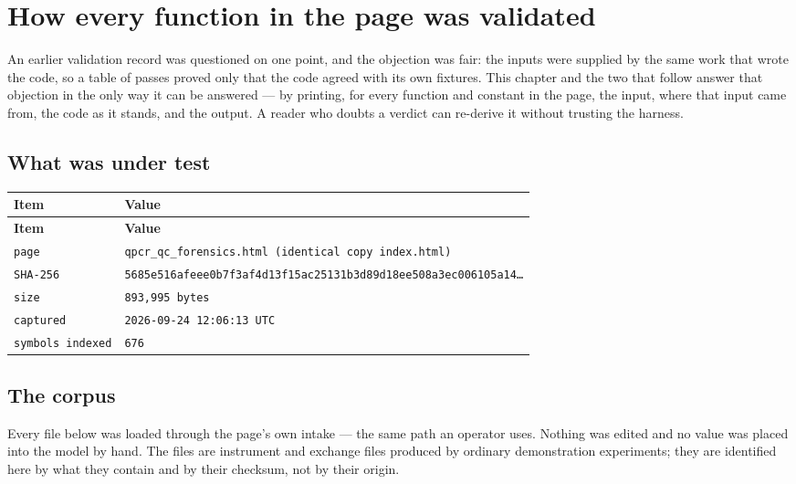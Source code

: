 \chapter{How every function in the page was validated}\label{ch:val-method}

An earlier validation record was questioned on one point, and the objection was
fair: the inputs were supplied by the same work that wrote the code, so a table of
passes proved only that the code agreed with its own fixtures. This chapter and
the two that follow answer that objection in the only way it can be answered ---
by printing, for every function and constant in the page, the input, where that
input came from, the code as it stands, and the output. A reader who doubts a
verdict can re-derive it without trusting the harness.

\section{What was under test}

{\small
\begin{xltabular}{\linewidth}{|X|l|}
\toprule \textbf{Item} & \textbf{Value} \\\midrule\endfirsthead
\toprule \textbf{Item} & \textbf{Value} \\\midrule\endhead
\texttt{page} & \texttt{qpcr\_qc\_forensics.html (identical copy index.html)} \\
\texttt{SHA-256} & \texttt{5685e516afeee0b7f3af4d13f15ac25131b3d89d18ee508a3ec006105a14…} \\
\texttt{size} & \texttt{893,995 bytes} \\
\texttt{captured} & \texttt{2026-09-24 12:06:13 UTC} \\
\texttt{symbols indexed} & \texttt{676} \\
\bottomrule
\end{xltabular}}


\section{The corpus}
Every file below was loaded through the page's own intake --- the same path an
operator uses. Nothing was edited and no value was placed into the model by hand.
The files are instrument and exchange files produced by ordinary demonstration
experiments; they are identified here by what they contain and by their checksum,
not by their origin.


